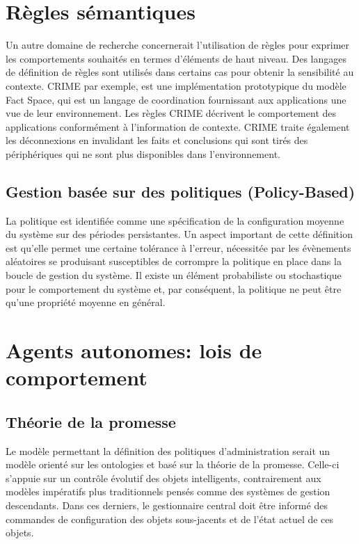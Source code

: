 \section{Règles sémantiques}

Un autre domaine de recherche concernerait l'utilisation de règles pour exprimer
les comportements souhaités en termes d'éléments de haut niveau. Des langages
de définition de règles sont utilisés dans certains cas pour obtenir la
sensibilité au contexte. CRIME \cite{murphy_coordination_2007} par exemple, est
une implémentation prototypique du modèle Fact Space, qui est un langage de
coordination fournissant aux applications une vue de leur environnement. Les
règles CRIME décrivent le comportement des applications conformément à
l'information de contexte. CRIME traite également les déconnexions en invalidant
les faits et conclusions qui sont tirés des périphériques qui ne sont plus
disponibles dans l'environnement.

\subsection{Gestion basée sur des politiques (Policy-Based)}

La politique est identifiée comme une spécification de la configuration moyenne
du système sur des périodes persistantes. Un aspect important de cette
définition est qu'elle permet une certaine tolérance à l'erreur, nécessitée par
les évènements aléatoires se produisant susceptibles de corrompre la politique
en place dans la boucle de gestion du système. Il existe un élément probabiliste
ou stochastique pour le comportement du système et, par conséquent, la politique
ne peut être qu'une propriété moyenne en général.

\section{Agents autonomes: lois de comportement}

\subsection{Théorie de la promesse}

Le modèle permettant la définition des politiques d'administration serait un
modèle orienté sur les ontologies et basé sur la théorie de la promesse.
Celle-ci s'appuie sur un contrôle évolutif des objets intelligents,
contrairement aux modèles impératifs plus traditionnels pensés comme des
systèmes de gestion descendants. Dans ces derniers, le gestionnaire central
doit être informé des commandes de configuration des objets sous-jacents et de
l'état actuel de ces objets.

